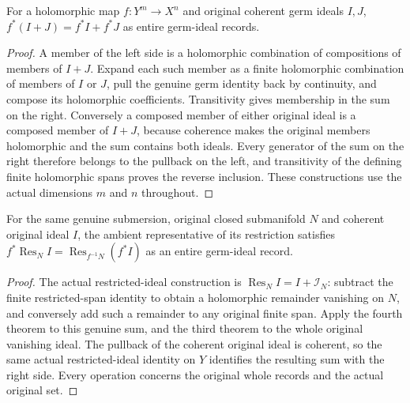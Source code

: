 \begin{theorem}
\label{hir:submersion-relative-ideal-sums}
For a holomorphic map $f:Y^m\to X^n$ and original coherent germ ideals $I,J$,
$f^*(I+J)=f^*I+f^*J$ as entire germ-ideal records.
\leanok
\begin{proof}
A member of the left side is a holomorphic combination of compositions of
members of $I+J$. Expand each such member as a finite holomorphic combination
of members of $I$ or $J$, pull the genuine germ identity back by continuity,
and compose its holomorphic coefficients. Transitivity gives membership in
the sum on the right. Conversely a composed member of either original ideal
is a composed member of $I+J$, because coherence makes the original members
holomorphic and the sum contains both ideals. Every generator of the sum on
the right therefore belongs to the pullback on the left, and transitivity of
the defining finite holomorphic spans proves the reverse inclusion. These
constructions use the actual dimensions $m$ and $n$ throughout.
\end{proof}
\end{theorem}

\begin{theorem}
\label{hir:submersion-relative-restricted-ideal}
For the same genuine submersion, original closed submanifold $N$ and coherent
original ideal $I$, the ambient representative of its restriction satisfies
$f^*\operatorname{Res}_N I=\operatorname{Res}_{f^{-1}N}(f^*I)$ as an entire
germ-ideal record.
\leanok
\begin{proof}
The actual restricted-ideal construction is $\operatorname{Res}_N I=
I+\mathcal I_N$: subtract the finite restricted-span identity to obtain a
holomorphic remainder vanishing on $N$, and conversely add such a remainder
to any original finite span. Apply the fourth theorem to this genuine sum,
and the third theorem to the whole original vanishing ideal. The pullback of
the coherent original ideal is coherent, so the same actual restricted-ideal
identity on $Y$ identifies the resulting sum with the right side. Every
operation concerns the original whole records and the actual original set.
\end{proof}
\end{theorem}

